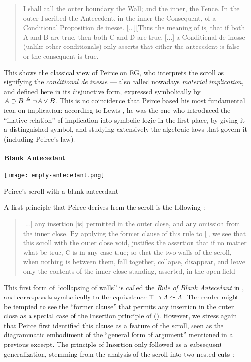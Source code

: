 \begin{quote}
  I shall call the outer boundary the Wall; and the inner, the Fence. In the
outer I scribed the Antecedent, in the inner the Consequent, of a Conditional
Proposition de inesse. [...][Thus the meaning of  is] that if
both A and B are true, then both C and D are true. [...] a Conditional de inesse
(unlike other conditionals) only asserts that either the antecedent is false or
the consequent is true. 
\end{quote}

This shows the classical view of Peirce on EG, who interprets the scroll as
signifying the \textit{conditional de inesse} --- also called nowadays
\emph{material implication}, and defined here in its disjunctive form, expressed
symbolically by $A \supset B \triangleq \neg A \lor B$. This is no coincidence that
Peirce based his most fundamental icon on implication: according to Lewis
, he was the one who introduced the
``illative relation'' of implication into symbolic logic in the first place, by
giving it a distinguished symbol, and studying extensively the algebraic laws
that govern it (including Peirce's law).

\paragraph{Blank Antecedant}

\begin{marginfigure}
  \texttt{[image: empty-antecedant.png]}
  \caption{Peirce's scroll with a blank antecedant}
\end{marginfigure}

A first principle that Peirce derives from the scroll is the following
\cite[p.~534]{peirce_prolegomena_1906}:

\begin{quote}
  [...] any insertion [is] permitted in the outer close, and any omission from
the inner close. By applying the former clause of this rule to
[], we see that this scroll with the outer close void,
justifies the assertion that if no matter what be true, C is in any case true;
so that the two walls of the scroll, when nothing is between them, fall
together, collapse, disappear, and leave only the contents of the inner close
standing, asserted, in the open field.
\end{quote}

This first form of ``collapsing of walls'' is called the \emph{Rule of Blank
Antecedant} in \cite{minghui_graphical_2019}, and corresponds symbolically to
the equivalence $\top \supset A \simeq A$. The reader might be tempted to see
the ``former clause'' that permits any insertion in the outer close as a special
case of the Insertion principle of  (). However, we
stress again that Peirce first identified this clause as a feature of the
scroll, seen as the diagrammatic embodiment of the ``general form of argument''
mentioned in a previous excerpt. The principle of Insertion only followed as a
subsequent generalization, stemming from the analysis of the scroll into two
nested cuts \cite[p.~535]{peirce_prolegomena_1906}:

